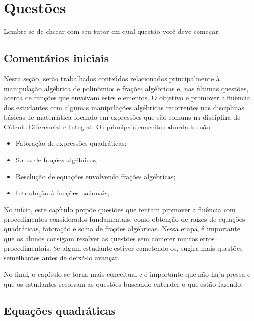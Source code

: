 \documentclass[main.tex]{subfiles}
\begin{document}
\paraAmbos

\newpage

\section{Questões}

Lembre-se de checar com seu tutor em qual questão você deve começar.

\paraTutores

\subsection{Comentários iniciais}

Nesta seção, serão trabalhados conteúdos relacionados principalmente à manipulação algébrica de polinômios e frações algébricas e, nas últimas questões, acerca de funções que envolvam estes elementos. O objetivo é promover a fluência dos estudantes com algumas manipulações algébricas recorrentes nas disciplinas básicas de matemática focando em expressões que são comuns na disciplina de Cálculo Diferencial e Integral. Os principais conceitos abordados são

\begin{itemize}
 \item Fatoração de expressões quadráticas;
 \item Soma de frações algébricas;
 \item Resolução de equações envolvendo frações algébricas;
 \item Introdução à funções racionais;
\end{itemize}

No início, este capítulo propõe questões que tentam promover a fluência com procedimentos considerados fundamentais, como obtenção de raízes de equações quadráticas, fatoração e soma de frações algébricas. Nessa etapa, é importante que os alunos consigam resolver as questões sem cometer muitos erros procedimentais. Se algum estudante estiver cometendo-os, sugira mais questões semelhantes antes de deixá-lo avançar.

No final, o capítulo se torna mais conceitual e é importante que não haja pressa e que os estudantes resolvam as questões buscando entender o que estão fazendo.

\paraAmbos

\subsection*{Equações quadráticas}
\end{document}
